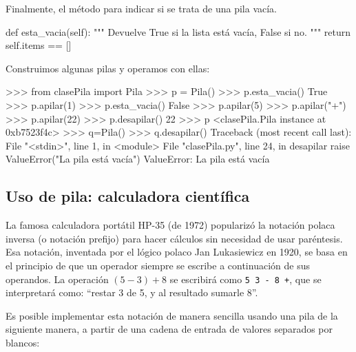 Finalmente, el método para indicar si se trata de una pila vacía.

\begin{codigo-python-sn}
    def esta_vacia(self):
        """ Devuelve True si la lista está vacía, False si no. """
        return self.items == []
\end{codigo-python-sn}

Construimos algunas pilas y operamos con ellas:

\begin{codigo-python-sn}
>>> from clasePila import Pila
>>> p = Pila()
>>> p.esta_vacia()
True
>>> p.apilar(1)
>>> p.esta_vacia()
False
>>> p.apilar(5)
>>> p.apilar("+")
>>> p.apilar(22)
>>> p.desapilar()
22
>>> p
<clasePila.Pila instance at 0xb7523f4c>
>>> q=Pila()
>>> q.desapilar()
Traceback (most recent call last):
  File "<stdin>", line 1, in <module>
  File "clasePila.py", line 24, in desapilar
    raise ValueError("La pila está vacía")
ValueError: La pila está vacía
\end{codigo-python-sn}

\subsection{Uso de pila: calculadora científica}

La famosa calculadora portátil HP-35 (de 1972) popularizó la notación
polaca inversa (o notación prefijo) para hacer cálculos sin necesidad de
usar paréntesis. Esa notación, inventada por el lógico polaco Jan
Lukasiewicz en 1920, se basa en el principio de que un operador siempre se
escribe a continuación de sus operandos. La operación $(5-3)+8$ se
escribirá como \lstinline|5 3 - 8 +|, que se interpretará como: ``restar 3
de 5, y al resultado sumarle 8''.

Es posible implementar esta notación de manera sencilla usando una pila de
la siguiente manera, a partir de una cadena de entrada de valores separados
por blancos:

